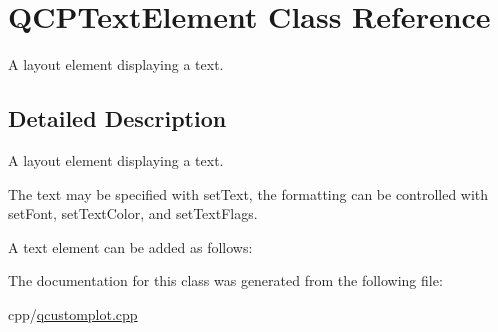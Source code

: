 \hypertarget{class_q_c_p_text_element}{}\section{Q\+C\+P\+Text\+Element Class Reference}
\label{class_q_c_p_text_element}


A layout element displaying a text.  




\subsection{Detailed Description}
A layout element displaying a text. 

The text may be specified with set\+Text, the formatting can be controlled with set\+Font, set\+Text\+Color, and set\+Text\+Flags.

A text element can be added as follows\+: 
\begin{DoxyCodeInclude}
\end{DoxyCodeInclude}


The documentation for this class was generated from the following file\+:\begin{DoxyCompactItemize}
\item 
cpp/\mbox{\hyperlink{qcustomplot_8cpp}{qcustomplot.\+cpp}}\end{DoxyCompactItemize}
